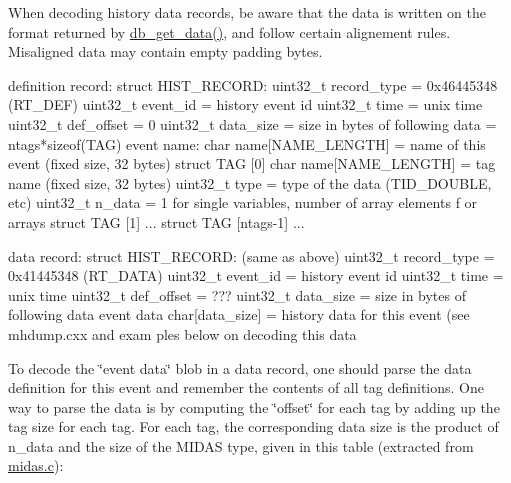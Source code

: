 When decoding history data records, be aware that the data is written on the format returned by \hyperlink{group__odbfunctionc_ga8d8bb0ee338e5fbc46fed2c29e697540}{db\_\-get\_\-data()}, and follow certain alignement rules. Misaligned data may contain empty padding bytes. 
\begin{DoxyCode}
definition record:
   struct HIST_RECORD:
      uint32_t record_type = 0x46445348 (RT_DEF)
      uint32_t event_id    = history event id
      uint32_t time        = unix time
      uint32_t def_offset  = 0
      uint32_t data_size   = size in bytes of following data = ntags*sizeof(TAG)
   event name:
      char name[NAME_LENGTH] = name of this event (fixed size, 32 bytes)
   struct TAG [0]
      char name[NAME_LENGTH] = tag name (fixed size, 32 bytes)
      uint32_t type          = type of the data (TID_DOUBLE, etc)
      uint32_t n_data        = 1 for single variables, number of array elements f
      or arrays
   struct TAG [1]
      ...
   struct TAG [ntags-1]
      ...
\end{DoxyCode}



\begin{DoxyCode}
data record:
   struct HIST_RECORD: (same as above)
      uint32_t record_type = 0x41445348 (RT_DATA)
      uint32_t event_id    = history event id
      uint32_t time        = unix time
      uint32_t def_offset  = ???
      uint32_t data_size   = size in bytes of following data
   event data
      char[data_size]      = history data for this event (see mhdump.cxx and exam
      ples below on decoding this data
\end{DoxyCode}
 To decode the \char`\"{}event data\char`\"{} blob in a data record, one should parse the data definition for this event and remember the contents of all tag definitions. One way to parse the data is by computing the \char`\"{}offset\char`\"{} for each tag by adding up the tag size for each tag. For each tag, the corresponding data size is the product of n\_\-data and the size of the MIDAS type, given in this table (extracted from \hyperlink{midas_8c}{midas.c}):


